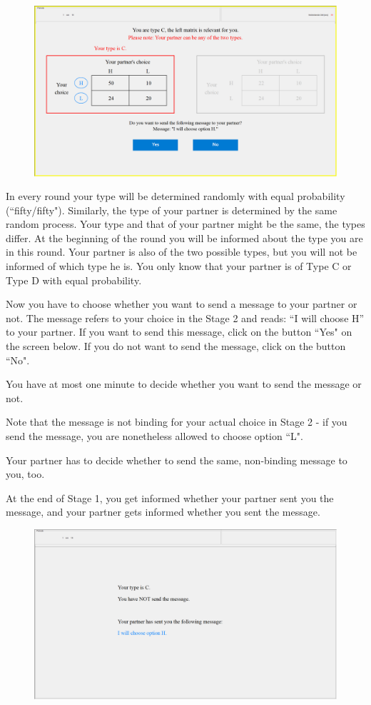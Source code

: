 \documentclass[12pt]{article}
\theoremstyle{break}
\begin{document}
\begin{figure}[h]
  \centering
    \includegraphics[width=.9\textwidth]{fig1-CT-instructions.png}
  \label{fig:fig1-CT-instructions}
\end{figure}


In every round your type will be determined randomly with equal probability (``fifty/fifty"). Similarly, the type of your partner is determined by the same random process. Your type and that of your partner might be the same, the types differ.
At the beginning of the round you will be informed about the type you are in this round. Your partner is also of the two possible types, but you will not be informed of which type he is. You only know that your partner is of Type C or Type D with equal probability.

Now you have to choose whether you want to send a message to your partner or not. The message refers to your choice in the Stage 2 and reads: “I will choose H” to your partner. If you want to send this message, click on the button ``Yes" on the screen below. If you do not want to send the message, click on the button ``No". 

You have at most one minute to decide whether you want to send the message or not. 

Note that the message is not binding for your actual choice in Stage 2 - if you send the message, you are nonetheless allowed to choose option ``L".

Your partner has to decide whether to send the same, non-binding message to you, too.

At the end of Stage 1, you get informed whether your partner sent you the message, and your partner gets informed whether you sent the message. 

\begin{figure}[h]
  \centering
    \includegraphics[width=.9\textwidth]{fig2-CT-instructions.png}
  \label{fig:fig2-CT-instructions}
\end{figure}
\end{document}
